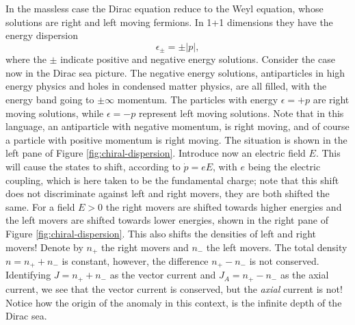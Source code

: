 In the massless case the Dirac equation reduce to the Weyl equation, whose solutions are right and left moving fermions.
In 1+1 dimensions they have the energy dispersion
\[
  \epsilon  _{\pm} = \pm |p|,
\]
where the $\pm$ indicate positive and negative energy solutions.
Consider the case now in the Dirac sea picture.
The negative energy solutions, antiparticles in high energy physics  and holes in condensed matter physics, are all filled, with the energy band going to $\pm \infty $ momentum.
The particles with energy $\epsilon  = +p$ are right moving solutions, while $\epsilon  = -p$ represent left moving solutions.
Note that in this language, an antiparticle with negative momentum, is right moving, and of course a particle with positive momentum is right moving.
The situation is shown in the left pane of Figure \ref{fig:chiral-dispersion}.
Introduce now an electric field \(E\).
This will cause the states to shift, according to $\dot{p} = e E$, with $e$ being the electric coupling, which is here taken to be the fundamental charge;
note that this shift does not discriminate against left and right movers, they are both shifted the same.
For a field $E > 0$ the right movers are shifted towards higher energies and the left movers are shifted towards lower energies, shown in the right pane of Figure \ref{fig:chiral-dispersion}.
This also shifts the densities of left and right movers!
Denote by $n_+$ the right movers and $n_-$ the left movers.
The total density $n = n_+ + n_-$ is constant, however, the difference $n_+ - n_-$ is not conserved.
Identifying $J = n_+ + n_-$ as the vector current and $J_A = n_+  - n_{-}$ as the axial current, we see that the vector current is conserved, but the \emph{axial} current is not!
Notice how the origin of the anomaly in this context, is the infinite depth of the Dirac sea.

